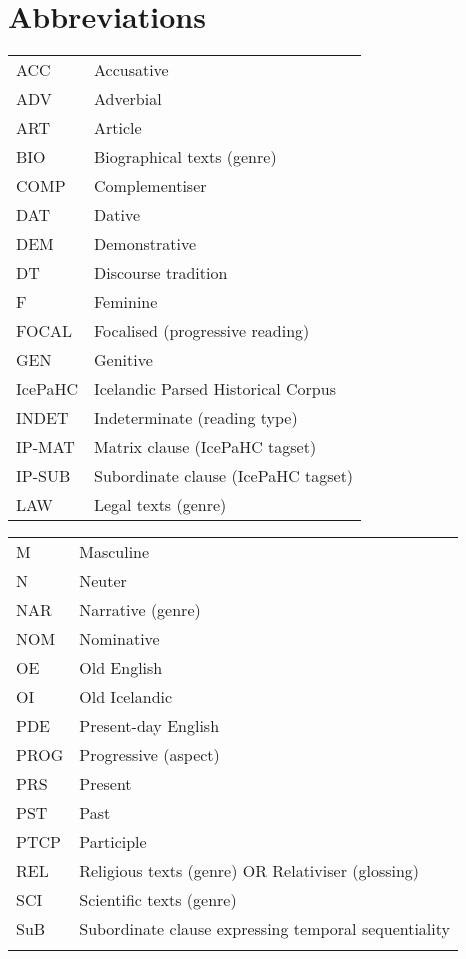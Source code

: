 \documentclass[output=paper,colorlinks,citecolor=brown]{langscibook}
\begin{document}
\section*{Abbreviations}
\begin{tabularx}{.55\textwidth}{@{}lQ@{}}
ACC & Accusative\\
ADV & Adverbial\\
ART & Article\\
BIO & Biographical texts (genre)\\
COMP & Complementiser\\
DAT & Dative \\
DEM & Demonstrative \\
DT & Discourse tradition \\
F & Feminine \\
FOCAL & Focalised (progressive reading) \\
GEN & Genitive  \\
IcePaHC & Icelandic Parsed Historical Corpus \\
INDET & Indeterminate (reading type)\\
IP-MAT & Matrix clause (IcePaHC tagset) \\
IP-SUB & Subordinate clause (IcePaHC tagset) \\
LAW & Legal texts (genre)\\
\end{tabularx}%
\begin{tabularx}{.45\textwidth}{@{}lQ@{}}
M & Masculine \\
N & Neuter \\
NAR & Narrative (genre) \\
NOM & Nominative  \\
OE & Old English \\
OI & Old Icelandic \\
PDE & Present-day English \\
PROG & Progressive (aspect)\\
PRS & Present\\
PST & Past\\
PTCP & Participle \\
REL & Religious texts (genre) OR Relativiser (glossing) \\
SCI & Scientific texts (genre) \\
SuB & Subordinate clause expressing temporal sequentiality\\
\\
\end{tabularx}

\end{document}
